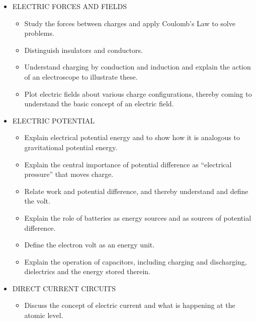\documentclass{article}
\begin{document}
%
\begin{itemize}

\item ELECTRIC FORCES AND FIELDS
%
\begin{itemize}

\item Study the forces between charges and apply Coulomb's Law to solve problems.

\item Distinguish insulators and conductors.

\item Understand charging by conduction and induction and explain the action of an electroscope to illustrate these.

\item Plot electric fields about various charge configurations, thereby coming to understand the basic concept of an electric field.

\end{itemize}

\item ELECTRIC POTENTIAL
%
\begin{itemize}

\item Explain electrical potential energy and to show how it is analogous to gravitational potential energy.

\item Explain the central importance of potential difference as ``electrical pressure'' that moves charge.

\item Relate work and potential difference, and thereby understand and define the volt.

\item Explain the role of batteries as energy sources and as sources of potential difference.

\item Define the electron volt as an energy unit.

\item Explain the operation of capacitors, including charging and discharging, dielectrics and the energy stored therein.

\end{itemize}

\item DIRECT CURRENT CIRCUITS
%
\begin{itemize}

\item Discuss the concept of electric current and what is happening at the atomic level.


\end{itemize}
\end{itemize}
\end{document}
